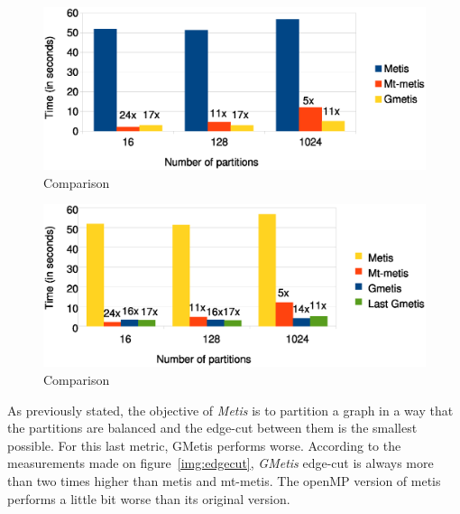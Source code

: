 \documentclass[abstract=on,9pt,twocolumn]{scrartcl}
\begin{document}



\begin{center}
\begin{figure}[htb]
    \includegraphics[width=\columnwidth]{img/comparison3.eps}
    \caption{Comparison}
    \label{img:comparison3}
\end{figure}
\end{center}

\begin{center}
\begin{figure}[htb]
    \includegraphics[width=\columnwidth]{img/comparison4.eps}
    \caption{Comparison}
    \label{img:comparison4}
\end{figure}
\end{center}

As previously stated, the objective of \textit{Metis} is to partition a graph in a way
that the partitions are balanced and the edge-cut between them is the smallest
possible. For this last metric, GMetis performs worse. According to the
measurements made on figure~\ref{img:edgecut}, \textit{GMetis} edge-cut is
always more than two times higher than metis and mt-metis. The openMP
version of metis performs a little bit worse than its original version.
\end{document}
